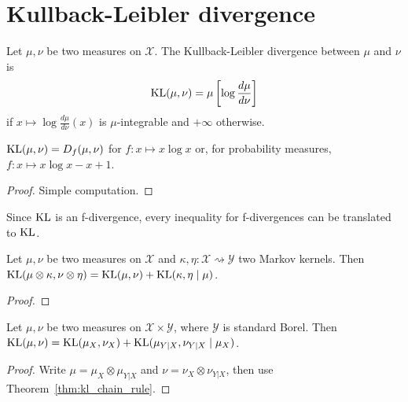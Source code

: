 \chapter{Kullback-Leibler divergence}

\begin{definition}
  \label{def:KL}
  Let $\mu, \nu$ be two measures on $\mathcal X$. The Kullback-Leibler divergence between $\mu$ and $\nu$ is
  \begin{align*}
  \mathrm{KL}(\mu, \nu) = \mu\left[\log \frac{d \mu}{d \nu}\right]
  \end{align*}
  if $x \mapsto \log \frac{d \mu}{d \nu}(x)$ is $\mu$-integrable and $+\infty$ otherwise.
\end{definition}

\begin{lemma}
  \label{lem:kl_eq_fDiv}
  $\mathrm{KL}(\mu, \nu) = D_f(\mu, \nu)$ for $f: x \mapsto x \log x$ or, for probability measures, $f: x \mapsto x \log x - x + 1$.
\end{lemma}

\begin{proof}
Simple computation.
\end{proof}

Since $\mathrm{KL}$ is an f-divergence, every inequality for f-divergences can be translated to $\mathrm{KL}$.

\begin{theorem}
  \label{thm:kl_chain_rule}
  Let $\mu, \nu$ be two measures on $\mathcal X$ and $\kappa, \eta : \mathcal X \rightsquigarrow \mathcal Y$ two Markov kernels.
  Then $\mathrm{KL}(\mu \otimes \kappa, \nu \otimes \eta) = \mathrm{KL}(\mu, \nu) + \mathrm{KL}(\kappa, \eta \mid \mu)$.
\end{theorem}

\begin{proof}
\end{proof}

\begin{theorem}
  \label{thm:kl_chain_rule_prod}
  Let $\mu, \nu$ be two measures on $\mathcal X \times \mathcal Y$, where $\mathcal Y$ is standard Borel.
  Then $\mathrm{KL}(\mu, \nu) = \mathrm{KL}(\mu_X, \nu_X) + \mathrm{KL}(\mu_{Y|X}, \nu_{Y|X} \mid \mu_X)$.
\end{theorem}

\begin{proof}
Write $\mu = \mu_X \otimes \mu_{Y|X}$ and $\nu = \nu_X \otimes \nu_{Y|X}$, then use Theorem~\ref{thm:kl_chain_rule}.
\end{proof}
